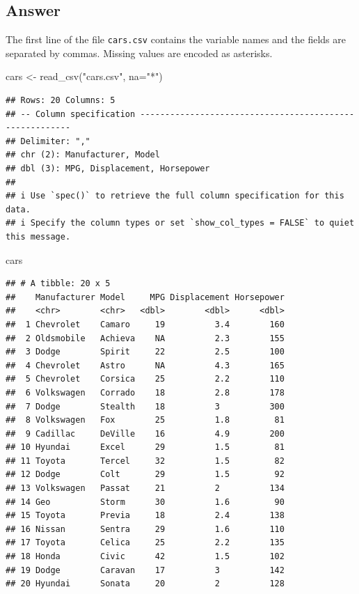 \documentclass[
]{book}
\newenvironment{Shaded}{\begin{snugshade}}{\end{snugshade}}
\newcommand{\AttributeTok}[1]{\textcolor[rgb]{0.77,0.63,0.00}{#1}}
\newcommand{\FunctionTok}[1]{\textcolor[rgb]{0.00,0.00,0.00}{#1}}
\newcommand{\NormalTok}[1]{#1}
\newcommand{\OtherTok}[1]{\textcolor[rgb]{0.56,0.35,0.01}{#1}}
\newcommand{\StringTok}[1]{\textcolor[rgb]{0.31,0.60,0.02}{#1}}
\begin{document}
\hypertarget{answer-1}{%
\subsection{Answer}\label{answer-1}}

The first line of the file \texttt{cars.csv} contains the variable names and the fields are separated by commas. Missing values are encoded as asterisks.

\begin{Shaded}
\begin{Highlighting}[]
\NormalTok{cars }\OtherTok{\textless{}{-}} \FunctionTok{read\_csv}\NormalTok{(}\StringTok{"cars.csv"}\NormalTok{, }\AttributeTok{na=}\StringTok{"*"}\NormalTok{)}
\end{Highlighting}
\end{Shaded}

\begin{verbatim}
## Rows: 20 Columns: 5
## -- Column specification --------------------------------------------------------
## Delimiter: ","
## chr (2): Manufacturer, Model
## dbl (3): MPG, Displacement, Horsepower
## 
## i Use `spec()` to retrieve the full column specification for this data.
## i Specify the column types or set `show_col_types = FALSE` to quiet this message.
\end{verbatim}

\begin{Shaded}
\begin{Highlighting}[]
\NormalTok{cars}
\end{Highlighting}
\end{Shaded}

\begin{verbatim}
## # A tibble: 20 x 5
##    Manufacturer Model     MPG Displacement Horsepower
##    <chr>        <chr>   <dbl>        <dbl>      <dbl>
##  1 Chevrolet    Camaro     19          3.4        160
##  2 Oldsmobile   Achieva    NA          2.3        155
##  3 Dodge        Spirit     22          2.5        100
##  4 Chevrolet    Astro      NA          4.3        165
##  5 Chevrolet    Corsica    25          2.2        110
##  6 Volkswagen   Corrado    18          2.8        178
##  7 Dodge        Stealth    18          3          300
##  8 Volkswagen   Fox        25          1.8         81
##  9 Cadillac     DeVille    16          4.9        200
## 10 Hyundai      Excel      29          1.5         81
## 11 Toyota       Tercel     32          1.5         82
## 12 Dodge        Colt       29          1.5         92
## 13 Volkswagen   Passat     21          2          134
## 14 Geo          Storm      30          1.6         90
## 15 Toyota       Previa     18          2.4        138
## 16 Nissan       Sentra     29          1.6        110
## 17 Toyota       Celica     25          2.2        135
## 18 Honda        Civic      42          1.5        102
## 19 Dodge        Caravan    17          3          142
## 20 Hyundai      Sonata     20          2          128
\end{verbatim}
\end{document}
